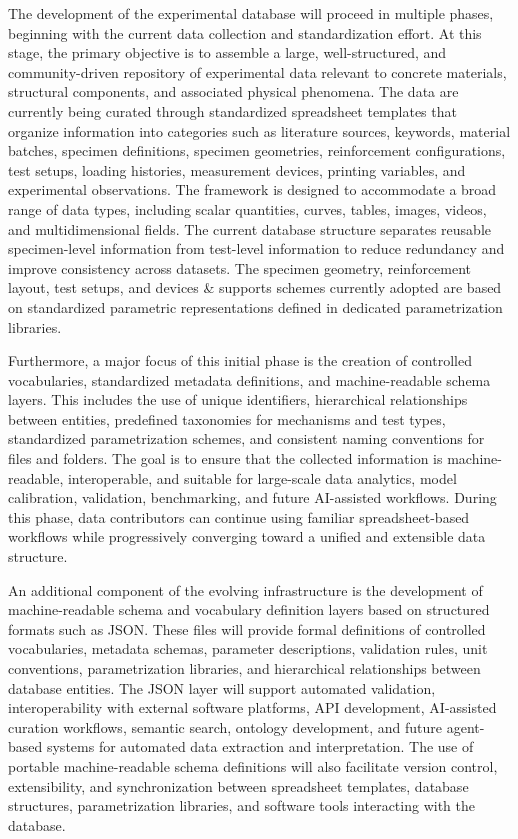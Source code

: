 \documentclass[11pt]{book}
\begin{document}
The development of the experimental database will proceed in multiple phases, beginning with the current data collection and standardization effort. At this stage, the primary objective is to assemble a large, well-structured, and community-driven repository of experimental data relevant to concrete materials, structural components, and associated physical phenomena. The data are currently being curated through standardized spreadsheet templates that organize information into categories such as literature sources, keywords, material batches, specimen definitions, specimen geometries, reinforcement configurations, test setups, loading histories, measurement devices, printing variables, and experimental observations. The framework is designed to accommodate a broad range of data types, including scalar quantities, curves, tables, images, videos, and multidimensional fields. The current database structure separates reusable specimen-level information from test-level information to reduce redundancy and improve consistency across datasets. The specimen geometry, reinforcement layout, test setups, and devices \& supports schemes currently adopted are based on standardized parametric representations defined in dedicated parametrization libraries.

Furthermore, a major focus of this initial phase is the creation of controlled vocabularies, standardized metadata definitions, and machine-readable schema layers. This includes the use of unique identifiers, hierarchical relationships between entities, predefined taxonomies for mechanisms and test types, standardized parametrization schemes, and consistent naming conventions for files and folders. The goal is to ensure that the collected information is machine-readable, interoperable, and suitable for large-scale data analytics, model calibration, validation, benchmarking, and future AI-assisted workflows. During this phase, data contributors can continue using familiar spreadsheet-based workflows while progressively converging toward a unified and extensible data structure.

An additional component of the evolving infrastructure is the development of machine-readable schema and vocabulary definition layers based on structured formats such as JSON. These files will provide formal definitions of controlled vocabularies, metadata schemas, parameter descriptions, validation rules, unit conventions, parametrization libraries, and hierarchical relationships between database entities. The JSON layer will support automated validation, interoperability with external software platforms, API development, AI-assisted curation workflows, semantic search, ontology development, and future agent-based systems for automated data extraction and interpretation. The use of portable machine-readable schema definitions will also facilitate version control, extensibility, and synchronization between spreadsheet templates, database structures, parametrization libraries, and software tools interacting with the database.
\end{document}
